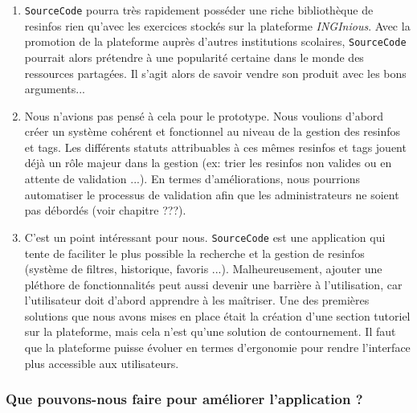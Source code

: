 \bigskip
\begin{enumerate}
    \item \texttt{SourceCode} pourra très rapidement posséder une riche bibliothèque de \glspl{resinfo} rien qu'avec les exercices stockés sur la plateforme \textit{INGInious}. Avec la promotion de la plateforme auprès d'autres institutions scolaires, \texttt{SourceCode} pourrait alors prétendre à une popularité certaine dans le monde des ressources partagées. Il s'agit alors de savoir vendre son produit avec les bons arguments...
    \item Nous n'avions pas pensé à cela pour le prototype. Nous voulions d'abord créer un système cohérent et fonctionnel au niveau de la gestion des \glspl{resinfo} et \glspl{tag}. Les différents statuts attribuables à ces mêmes \glspl{resinfo} et \glspl{tag} jouent déjà un rôle majeur dans la gestion (ex: trier les \glspl{resinfo} non valides ou en attente de validation ...). En termes d'améliorations, nous pourrions automatiser le processus de validation afin que les administrateurs ne soient pas débordés (voir chapitre ???).
    \item C'est un point intéressant pour nous. \texttt{SourceCode} est une application qui tente de faciliter le plus possible la recherche et la gestion de \glspl{resinfo} (système de filtres, historique, favoris ...). Malheureusement, ajouter une pléthore de fonctionnalités peut aussi devenir une barrière à l'utilisation, car l'utilisateur doit d'abord apprendre à les maîtriser. Une des premières solutions que nous avons mises en place était la création d'une section tutoriel sur la plateforme, mais cela n'est qu'une solution de contournement. Il faut que la plateforme puisse évoluer en termes d'ergonomie pour rendre l'interface plus accessible aux utilisateurs.
\end{enumerate}

\subsubsection*{Que pouvons-nous faire pour améliorer l'application ?}

